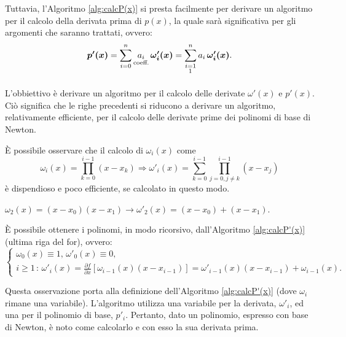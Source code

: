 Tuttavia, l'Algoritmo \ref{alg:calcP(x)} si presta facilmente per derivare un algoritmo per il calcolo della derivata prima di $p(x)$, la quale sarà significativa per gli argomenti che saranno trattati, ovvero:
\begin{equation*}
    \boldsymbol{p'(x)}=\sum_{i=0}^n\underset{\text{coeff.}}{a_i}\,\boldsymbol{\omega'_i(x)}=\sum_{\underset{\footnotemark}{i=1}}^na_i\,\boldsymbol{\omega'_i(x)}.
\end{equation*}

L'obbiettivo è derivare un algoritmo per il calcolo delle derivate $\omega'(x)$ e $p'(x)$. Ciò significa che le righe precedenti si riducono a derivare un algoritmo, relativamente efficiente, per il calcolo delle derivate prime dei polinomi di base di Newton.

È possibile osservare che il calcolo di $\omega_i(x)$ come
\begin{equation*}
    \omega_i(x)=\prod_{k=0}^{i-1}(x-x_k)\Rightarrow \omega'_i(x)=\sum_{k=0}^{i-1}\prod_{j=0,j\neq k}^{i-1}(x-x_j)
\end{equation*}
è dispendioso e poco efficiente, se calcolato in questo modo.

\begin{example}
    $\omega_2(x)=(x-x_0)(x-x_1) \rightarrow \omega'_2(x)=(x-x_0)+(x-x_1)$.
\end{example}

\begin{remark}
    È possibile ottenere i polinomi, in modo ricorsivo, dall'Algoritmo \ref{alg:calcP'(x)} (ultima riga del for), ovvero:
    \begin{equation*}
        \begin{cases}
            \omega_0(x)\equiv 1,\, \omega'_0(x)\equiv 0,\\
            i\geq 1\,:\, \omega'_i(x)=\frac{\partial f}{\partial x}[\omega_{i-1}(x)(x-x_{i-1})] = \omega'_{i-1}(x)(x-x_{i-1})+\omega_{i-1}(x).
        \end{cases}
    \end{equation*}
\end{remark}

Questa osservazione porta alla definizione dell'Algoritmo \ref{alg:calcP'(x)} (dove $\omega_i$ rimane una variabile). L'algoritmo utilizza una variabile per la derivata, $\omega'_i$, ed una per il polinomio di base, $p'_i$. Pertanto, dato un polinomio, espresso con base di Newton, è noto come calcolarlo e con esso la sua derivata prima.

